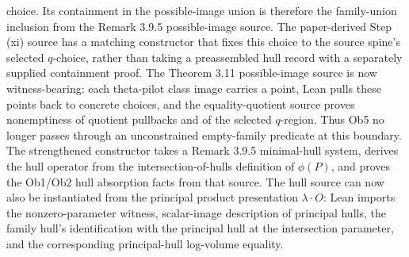 \begin{proposition}
  choice.  Its containment in the possible-image union is therefore the
  family-union inclusion from the Remark 3.9.5 possible-image source.  The
  paper-derived Step (xi) source has a matching constructor that fixes this
  choice to the source spine's selected \(q\)-choice, rather than taking a
  preassembled hull record with a separately supplied containment proof.  The
  Theorem 3.11 possible-image source is now witness-bearing: each theta-pilot
  class image carries a point, Lean pulls these points back to concrete
  choices, and the equality-quotient source proves nonemptiness of quotient
  pullbacks and of the selected \(q\)-region.  Thus Ob5 no longer passes
  through an unconstrained empty-family predicate at this boundary.  The
  strengthened constructor takes a Remark 3.9.5 minimal-hull system, derives
  the hull operator from the intersection-of-hulls definition of \(\phi(P)\),
  and proves the Ob1/Ob2 hull absorption facts from that source.  The hull
  source can now also be instantiated from the principal product presentation
  \(\lambda\cdot O\): Lean imports the nonzero-parameter witness, scalar-image
  description of principal hulls, the family hull's identification with the
  principal hull at the intersection parameter, and the corresponding
  principal-hull log-volume equality.
\end{proposition}

